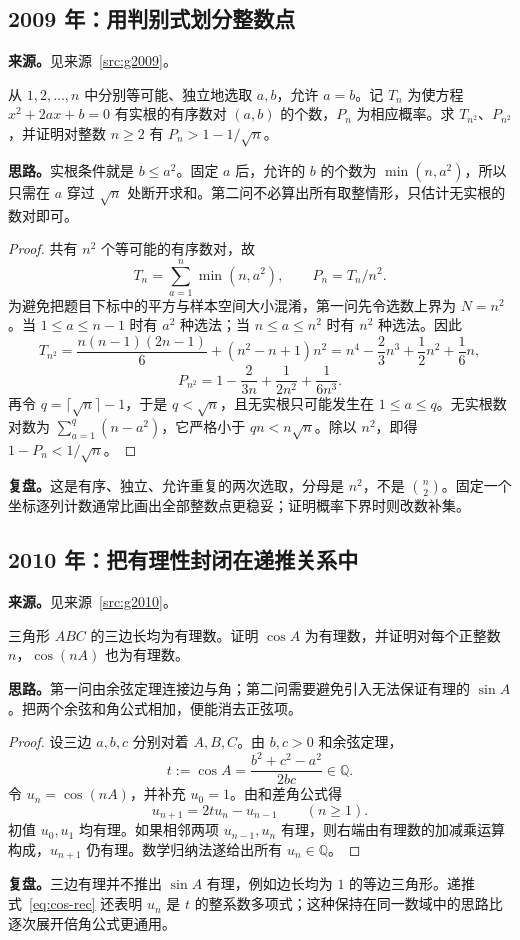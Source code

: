 \documentclass[UTF8,12pt,a4paper,fontset=fandol]{ctexart}
\begin{document}
\subsection{2009 年：用判别式划分整数点}\label{sec:g2009}
\textbf{来源。}见来源~\ref{src:g2009}。
\begin{example}[题意重述]
从 $1,2,\ldots,n$ 中分别等可能、独立地选取 $a,b$，允许 $a=b$。记 $T_n$ 为使方程 $x^2+2ax+b=0$ 有实根的有序数对 $(a,b)$ 的个数，$P_n$ 为相应概率。求 $T_{n^2}$、$P_{n^2}$，并证明对整数 $n\geq2$ 有 $P_n>1-1/\sqrt n$。
\end{example}
\textbf{思路。}实根条件就是 $b\leq a^2$。固定 $a$ 后，允许的 $b$ 的个数为 $\min(n,a^2)$，所以只需在 $a$ 穿过 $\sqrt n$ 处断开求和。第二问不必算出所有取整情形，只估计无实根的数对即可。
\begin{proof}
共有 $n^2$ 个等可能的有序数对，故
\begin{equation}\label{eq:g2009-count}
T_n=\sum_{a=1}^{n}\min(n,a^2),\qquad P_n=T_n/n^2.
\end{equation}
为避免把题目下标中的平方与样本空间大小混淆，第一问先令选数上界为 $N=n^2$。当 $1\leq a\leq n-1$ 时有 $a^2$ 种选法；当 $n\leq a\leq n^2$ 时有 $n^2$ 种选法。因此
\[
T_{n^2}=\frac{n(n-1)(2n-1)}6+(n^2-n+1)n^2
=n^4-\frac23n^3+\frac12n^2+\frac16n,
\]
\[
P_{n^2}=1-\frac{2}{3n}+\frac{1}{2n^2}+\frac{1}{6n^3}.
\]
再令 $q=\lceil\sqrt n\rceil-1$，于是 $q<\sqrt n$，且无实根只可能发生在 $1\leq a\leq q$。无实根数对数为 $\sum_{a=1}^{q}(n-a^2)$，它严格小于 $qn<n\sqrt n$。除以 $n^2$，即得 $1-P_n<1/\sqrt n$。
\end{proof}
\textbf{复盘。}这是有序、独立、允许重复的两次选取，分母是 $n^2$，不是 $\binom n2$。固定一个坐标逐列计数通常比画出全部整数点更稳妥；证明概率下界时则改数补集。

\subsection{2010 年：把有理性封闭在递推关系中}\label{sec:g2010}
\textbf{来源。}见来源~\ref{src:g2010}。
\begin{example}[题意重述]
三角形 $ABC$ 的三边长均为有理数。证明 $\cos A$ 为有理数，并证明对每个正整数 $n$，$\cos(nA)$ 也为有理数。
\end{example}
\textbf{思路。}第一问由余弦定理连接边与角；第二问需要避免引入无法保证有理的 $\sin A$。把两个余弦和角公式相加，便能消去正弦项。
\begin{proof}
设三边 $a,b,c$ 分别对着 $A,B,C$。由 $b,c>0$ 和余弦定理，
\[
t:=\cos A=\frac{b^2+c^2-a^2}{2bc}\in\mathbb Q.
\]
令 $u_n=\cos(nA)$，并补充 $u_0=1$。由和差角公式得
\begin{equation}\label{eq:cos-rec}
u_{n+1}=2tu_n-u_{n-1}\qquad(n\geq1).
\end{equation}
初值 $u_0,u_1$ 均有理。如果相邻两项 $u_{n-1},u_n$ 有理，则右端由有理数的加减乘运算构成，$u_{n+1}$ 仍有理。数学归纳法遂给出所有 $u_n\in\mathbb Q$。
\end{proof}
\textbf{复盘。}三边有理并不推出 $\sin A$ 有理，例如边长均为 $1$ 的等边三角形。递推式~\eqref{eq:cos-rec} 还表明 $u_n$ 是 $t$ 的整系数多项式；这种保持在同一数域中的思路比逐次展开倍角公式更通用。
\end{document}
